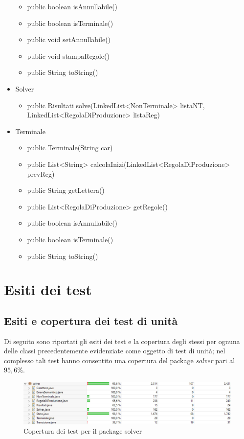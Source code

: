 \documentclass[12pt]{article}
\begin{document}
\begin{itemize}
\begin{itemize}
\item public boolean isAnnullabile()
\item public boolean isTerminale()
\item public void setAnnullabile()
\item public void stampaRegole()
\item public String toString()
\end{itemize}
\item Solver
\begin{itemize}
\item public Risultati solve(LinkedList<NonTerminale> listaNT, \\
\hspace*{104pt} LinkedList<RegolaDiProduzione> listaReg)
\end{itemize}
\item Terminale
\begin{itemize}
\item public Terminale(String car)
\item public List<String> calcolaInizi(LinkedList<RegolaDiProduzione> prevReg)
\item public String getLettera()
\item public List<RegolaDiProduzione> getRegole()
\item public boolean isAnnullabile()
\item public boolean isTerminale()
\item public String toString()
\end{itemize}
\end{itemize}
\pagebreak
\section{Esiti dei test}
\subsection{Esiti e copertura dei test di unità}
Di seguito sono riportati gli esiti dei test e la copertura degli stessi per ognuna delle classi precedentemente evidenziate come oggetto di test di unità; nel complesso tali test hanno consentito una copertura del package \textit{solver} pari al $95,6\%$.
\begin{figure}[h]
\centering
\includegraphics[width=\textwidth]{immagini/SolverCoverage.png}
\caption{Copertura dei test per il package solver}
\end{figure}
\end{document}
